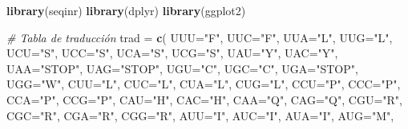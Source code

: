\documentclass[
]{article}
\newenvironment{Shaded}{\begin{snugshade}}{\end{snugshade}}
\newcommand{\AttributeTok}[1]{\textcolor[rgb]{0.13,0.29,0.53}{#1}}
\newcommand{\CommentTok}[1]{\textcolor[rgb]{0.56,0.35,0.01}{\textit{#1}}}
\newcommand{\FunctionTok}[1]{\textcolor[rgb]{0.13,0.29,0.53}{\textbf{#1}}}
\newcommand{\NormalTok}[1]{#1}
\newcommand{\OtherTok}[1]{\textcolor[rgb]{0.56,0.35,0.01}{#1}}
\newcommand{\SpecialCharTok}[1]{\textcolor[rgb]{0.81,0.36,0.00}{\textbf{#1}}}
\newcommand{\StringTok}[1]{\textcolor[rgb]{0.31,0.60,0.02}{#1}}
\begin{document}
\begin{Shaded}
\end{Shaded}

\begin{Shaded}
\begin{Highlighting}[]
\FunctionTok{library}\NormalTok{(seqinr)}
\FunctionTok{library}\NormalTok{(dplyr)}
\FunctionTok{library}\NormalTok{(ggplot2)}

\CommentTok{\# Tabla de traducción}
\NormalTok{trad }\OtherTok{=} \FunctionTok{c}\NormalTok{(}
  \AttributeTok{UUU=}\StringTok{"F"}\NormalTok{, }\AttributeTok{UUC=}\StringTok{"F"}\NormalTok{, }\AttributeTok{UUA=}\StringTok{"L"}\NormalTok{, }\AttributeTok{UUG=}\StringTok{"L"}\NormalTok{,}
  \AttributeTok{UCU=}\StringTok{"S"}\NormalTok{, }\AttributeTok{UCC=}\StringTok{"S"}\NormalTok{, }\AttributeTok{UCA=}\StringTok{"S"}\NormalTok{, }\AttributeTok{UCG=}\StringTok{"S"}\NormalTok{,}
  \AttributeTok{UAU=}\StringTok{"Y"}\NormalTok{, }\AttributeTok{UAC=}\StringTok{"Y"}\NormalTok{, }\AttributeTok{UAA=}\StringTok{"STOP"}\NormalTok{, }\AttributeTok{UAG=}\StringTok{"STOP"}\NormalTok{,}
  \AttributeTok{UGU=}\StringTok{"C"}\NormalTok{, }\AttributeTok{UGC=}\StringTok{"C"}\NormalTok{, }\AttributeTok{UGA=}\StringTok{"STOP"}\NormalTok{, }\AttributeTok{UGG=}\StringTok{"W"}\NormalTok{,}
  \AttributeTok{CUU=}\StringTok{"L"}\NormalTok{, }\AttributeTok{CUC=}\StringTok{"L"}\NormalTok{, }\AttributeTok{CUA=}\StringTok{"L"}\NormalTok{, }\AttributeTok{CUG=}\StringTok{"L"}\NormalTok{,}
  \AttributeTok{CCU=}\StringTok{"P"}\NormalTok{, }\AttributeTok{CCC=}\StringTok{"P"}\NormalTok{, }\AttributeTok{CCA=}\StringTok{"P"}\NormalTok{, }\AttributeTok{CCG=}\StringTok{"P"}\NormalTok{,}
  \AttributeTok{CAU=}\StringTok{"H"}\NormalTok{, }\AttributeTok{CAC=}\StringTok{"H"}\NormalTok{, }\AttributeTok{CAA=}\StringTok{"Q"}\NormalTok{, }\AttributeTok{CAG=}\StringTok{"Q"}\NormalTok{,}
  \AttributeTok{CGU=}\StringTok{"R"}\NormalTok{, }\AttributeTok{CGC=}\StringTok{"R"}\NormalTok{, }\AttributeTok{CGA=}\StringTok{"R"}\NormalTok{, }\AttributeTok{CGG=}\StringTok{"R"}\NormalTok{,}
  \AttributeTok{AUU=}\StringTok{"I"}\NormalTok{, }\AttributeTok{AUC=}\StringTok{"I"}\NormalTok{, }\AttributeTok{AUA=}\StringTok{"I"}\NormalTok{, }\AttributeTok{AUG=}\StringTok{"M"}\NormalTok{,}

\end{Highlighting}
\end{Shaded}
\end{document}
